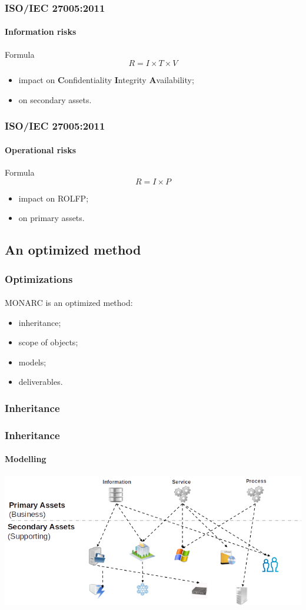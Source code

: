\begin{frame}
    \frametitle{ISO/IEC 27005:2011}
    \framesubtitle{Information risks}
    \begin{block}{Formula}
        $$R = I \times T \times V$$
        \begin{itemize}
            \item impact on \textbf{C}onfidentiality \textbf{I}ntegrity \textbf{A}vailability;
            \item on secondary assets.
        \end{itemize}
    \end{block}
\end{frame}


\begin{frame}
    \frametitle{ISO/IEC 27005:2011}
    \framesubtitle{Operational risks}
    \begin{block}{Formula}
        $$R = I \times P$$
        \begin{itemize}
            \item impact on ROLFP;
            \item on primary assets.
        \end{itemize}
    \end{block}
\end{frame}


\subsection{An optimized method}
\begin{frame}
    \frametitle{Optimizations}
    \framesubtitle{}
    MONARC is an optimized method:
    \begin{itemize}
        \item inheritance;
        \item scope of objects;
        \item models;
        \item deliverables.
    \end{itemize}
\end{frame}

\subsubsection{Inheritance}
\begin{frame}
    \frametitle{Inheritance}
    \framesubtitle{Modelling}
    \begin{center}
        \includegraphics[scale=0.45]{../common_pictures/MONARC-method-modelling.png}
    \end{center}
\end{frame}

